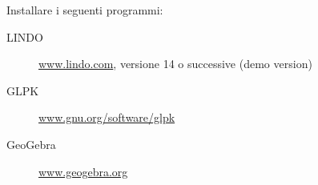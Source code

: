 \documentclass{beamer}
\begin{document}
\generatitolo

\begin{frame}{\attivitapratica}
Installare i seguenti programmi:

    \begin{description}
     \item[LINDO] \href{http://www.lindo.com/}{www.lindo.com}, versione 14 o successive (demo version)
     \item[GLPK] \href{http://www.gnu.org/software/glpk/}{www.gnu.org/software/glpk}
     \item[GeoGebra] \href{http://www.geogebra.org/}{www.geogebra.org}
    \end{description}
\end{frame}
\end{document}
